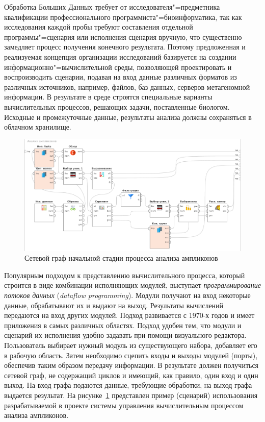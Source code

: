 \documentclass[a4paper,12pt,openany,final]{extreport}
\def\oldcaption{} \let\oldcaption=\caption
\def\caption{\stepcounter{captionsnum}\oldcaption}
\begin{document}
Обработка Больших Данных требует от исследователя"=предметника квалификации профессионального программиста"=биоинформатика, так как исследования каждой пробы требуют составления отдельной программы"=сценария или исполнения сценария вручную, что существенно замедляет процесс получения конечного результата. Поэтому предложенная и реализуемая концепция организации исследований базируется на создании информационно"=вычислительной среды, позволяющей проектировать и воспроизводить сценарии, подавая на вход данные различных форматов из различных источников, например, файлов, баз данных, серверов метагеномной информации. В результате в среде строятся специальные варианты вычислительных процессов, решающих задачи, поставленные биологом.  Исходные и промежуточные данные, результаты анализа должны сохраняться в облачном хранилище.


\begin{figure}[htbp]\centering
\includegraphics[width=0.9\linewidth]{media/image14.png}
\caption{Сетевой граф начальной стадии процесса анализа ампликонов}
\label{fig:ampl-an}
\end{figure}

Популярным подходом к представлению вычислительного процесса, который строится в виде комбинации исполняющих модулей, выступает \emph{программирование потоков данных} (\emph{dataflow programming}).  Модули получают на вход некоторые данные, обрабатывают их и выдают на выход. Результаты вычислений передаются на вход других модулей. Подход развивается с 1970-х годов и имеет приложения в самых различных областях. Подход удобен тем, что модули и сценарий их исполнения удобно задавать при помощи визуального редактора. Пользователь выбирает нужный модуль из существующего набора, добавляет его в рабочую область. Затем необходимо сцепить входы и выходы модулей (порты), обеспечив таким образом передачу информации. В результате должен получиться сетевой граф, не содержащий циклов и имеющий, как правило, один вход и один выход. На вход графа подаются данные, требующие обработки, на выход графа выдается результат. На рисунке~\ref{fig:ampl-an} представлен пример (сценарий) использования разрабатываемой в проекте системы управления вычислительным процессом анализа ампликонов.
\end{document}
